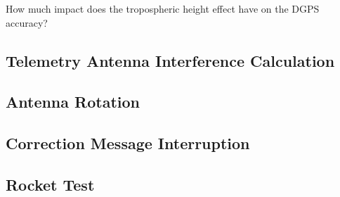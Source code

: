 How much impact does the tropospheric height effect have on the DGPS accuracy?

\subsection{Telemetry Antenna Interference Calculation}

\subsection{Antenna Rotation}

\subsection{Correction Message Interruption}

\subsection{Rocket Test}